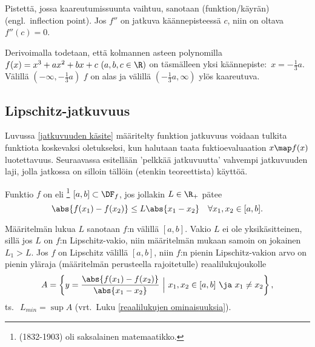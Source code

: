 Pistettä, jossa kaareutumissuunta vaihtuu, sanotaan (funktion/käyrän)
 (engl.\ inflection point). Jos $f''$ on jatkuva käännepisteessä $c$, niin
on oltava $f''(c)=0$.
\begin{Exa} Derivoimalla todetaan, että kolmannen asteen polynomilla 
$f(x)=x^3+ax^2+bx+c\ (a,b,c\in\R)$ on täsmälleen yksi käännepiste: $\,x=-\tfrac{1}{3}a$.
Välillä $(-\infty,-\tfrac{1}{3}a)$ $f$ on alas ja välillä $(-\tfrac{1}{3}a,\infty)$ ylös
kaareutuva. \loppu
\end{Exa}

\subsection*{Lipschitz-jatkuvuus}

Luvussa \ref{jatkuvuuden käsite} määritelty funktion jatkuvuus voidaan tulkita funktiota
koskevaksi oletukseksi, kun halutaan taata fuktioevaluaation $x \map f(x)$
luotettavuus. Seuraavassa esitellään 'pelkkää jatkuvuutta' vahvempi jatkuvuuden laji, jolla
jatkossa on silloin tällöin (etenkin teoreettista) käyttöä.
\begin{Def} \label{funktion l-jatkuvuus} 
Funktio $f$ on  eli \footnote[2]{
(1832-1903) oli saksalainen matemaatikko.} 
$[a,b]\subset\DF_f$, jos jollakin $L\in\R_+$ pätee
\[
\abs{f(x_1)-f(x_2)}\leq L\abs{x_1-x_2} \quad \forall x_1,x_2\in [a,b].
\]
\end{Def}
Määritelmän lukua $L$ sanotaan $f$:n  välillä $[a,b]$. Vakio $L$ ei
ole yksikäsitteinen, sillä jos $L$ on $f$:n Lipschitz-vakio, niin määritelmän mukaan samoin
on jokainen $L_1 > L$. Jos $f$ on Lipschitz välillä $[a,b]$, niin $f$:n pienin
Lipschitz-vakion arvo on pienin yläraja (määritelmän perusteella rajoitetulle)
reaalilukujoukolle
\[
A = \left\{ y = \frac{\abs{f(x_1)-f(x_2)}}{\abs{x_1-x_2}}\ 
                              \Big\vert\ x_1,x_2 \in [a,b]\ \ja\ x_1 \neq x_2\right\},
\]
ts.\ $\ L_{min} = \sup A$ (vrt.\ Luku \ref{reaalilukujen ominaisuuksia}).

